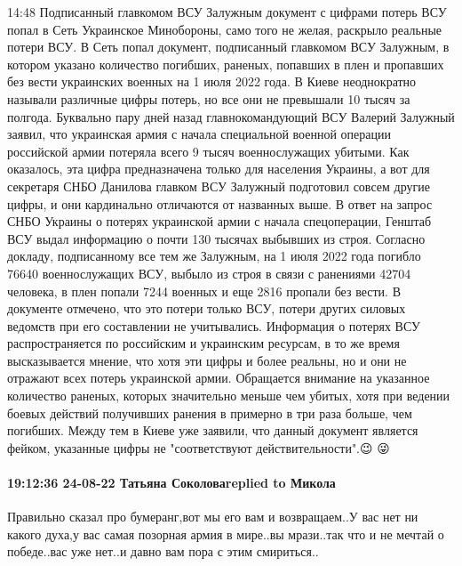 14:48
Подписанный главкомом ВСУ Залужным документ с цифрами потерь ВСУ попал в Сеть
Украинское Минобороны, само того не желая, раскрыло реальные потери ВСУ. В Сеть попал документ, подписанный главкомом ВСУ Залужным, в котором указано количество погибших, раненых, попавших в плен и пропавших без вести украинских военных на 1 июля 2022 года.
В Киеве неоднократно называли различные цифры потерь, но все они не превышали 10 тысяч за полгода. Буквально пару дней назад главнокомандующий ВСУ Валерий Залужный заявил, что украинская армия с начала специальной военной операции российской армии потеряла всего 9 тысяч военнослужащих убитыми.
Как оказалось, эта цифра предназначена только для населения Украины, а вот для секретаря СНБО Данилова главком ВСУ Залужный подготовил совсем другие цифры, и они кардинально отличаются от названных выше. В ответ на запрос СНБО Украины о потерях украинской армии с начала спецоперации, Генштаб ВСУ выдал информацию о почти 130 тысячах выбывших из строя. Согласно докладу, подписанному все тем же Залужным, на 1 июля 2022 года погибло 76640 военнослужащих ВСУ, выбыло из строя в связи с ранениями 42704 человека, в плен попали 7244 военных и еще 2816 пропали без вести. В документе отмечено, что это потери только ВСУ, потери других силовых ведомств при его составлении не учитывались.
Информация о потерях ВСУ распространяется по российским и украинским ресурсам, в то же время высказывается мнение, что хотя эти цифры и более реальны, но и они не отражают всех потерь украинской армии. Обращается внимание на указанное количество раненых, которых значительно меньше чем убитых, хотя при ведении боевых действий получивших ранения в примерно в три раза больше, чем погибших.
Между тем в Киеве уже заявили, что данный документ является фейком, указанные цифры не "соответствуют действительности".😉 😜

\paragraph{19:12:36 24-08-22 Татьяна Соколоваreplied to Микола}

Правильно сказал про бумеранг,вот мы его вам и возвращаем..У вас нет ни какого
духа,у вас самая позорная армия в мире..вы мрази..так что и не мечтай о
победе..вас уже нет..и давно вам пора с этим смириться..



